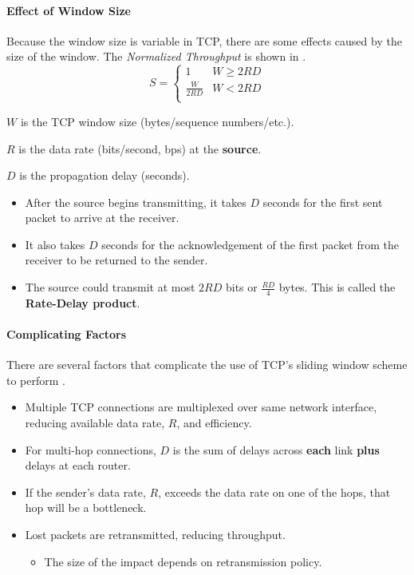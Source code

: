 \paragraph{Effect of Window Size}\label{par:TCP_Window_Size_Effect}
Because the window size is variable in TCP, there are some effects caused by the size of the window.
The \emph{Normalized Throughput} is shown in .
\begin{equation}\label{eq:TCP_Normalized_Throughput}
  S =
  \begin{cases}
    1 & W \geq 2RD \\
    \frac{W}{2RD} & W < 2RD \\
  \end{cases}
\end{equation}
\begin{description}[noitemsep]
\item $W$ is the TCP window size (bytes/sequence numbers/etc.).
\item $R$ is the data rate (bits/second, bps) at the \textbf{source}.
\item $D$ is the propagation delay (seconds).
  \begin{itemize}[noitemsep]
  \item After the source begins transmitting, it takes $D$ seconds for the first sent packet to arrive at the receiver.
  \item It also takes $D$ seconds for the acknowledgement of the first packet from the receiver to be returned to the sender.
  \item The source could transmit at most $2RD$ bits or $\frac{RD}{4}$ bytes.
    This is called the \textbf{Rate-Delay product}.
  \end{itemize}
\end{description}

\paragraph{Complicating Factors}\label{par:TCP_Complicating_Factors}
There are several factors that complicate the use of TCP's sliding window scheme to perform .
\begin{itemize}[noitemsep]
\item Multiple TCP connections are multiplexed over same network interface, reducing available data rate, $R$, and efficiency.
\item For multi-hop connections, $D$ is the sum of delays across \textbf{each} link \textbf{plus} delays at each router.
\item If the sender's data rate, $R$, exceeds the data rate on one of the hops, that hop will be a bottleneck.
\item Lost packets are retransmitted, reducing throughput.
  \begin{itemize}[noitemsep]
  \item The size of the impact depends on retransmission policy.
  \end{itemize}
\end{itemize}

